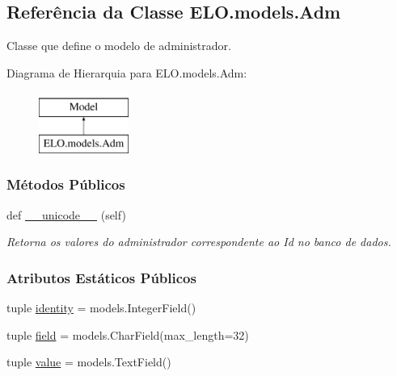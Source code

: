 \hypertarget{classELO_1_1models_1_1Adm}{}\subsection{Referência da Classe E\+L\+O.\+models.\+Adm}
\label{classELO_1_1models_1_1Adm}


Classe que define o modelo de administrador.  


Diagrama de Hierarquia para E\+L\+O.\+models.\+Adm\+:\begin{figure}[H]
\begin{center}
\leavevmode
\includegraphics[height=2.000000cm]{df/d5e/classELO_1_1models_1_1Adm}
\end{center}
\end{figure}
\subsubsection*{Métodos Públicos}
\begin{DoxyCompactItemize}
\item 
def \hyperlink{classELO_1_1models_1_1Adm_a321eaeaced2b6423fd23ad9d0401808e}{\+\_\+\+\_\+unicode\+\_\+\+\_\+} (self)
\begin{DoxyCompactList}\small\item\em Retorna os valores do administrador correspondente ao Id no banco de dados. \end{DoxyCompactList}\end{DoxyCompactItemize}
\subsubsection*{Atributos Estáticos Públicos}
\begin{DoxyCompactItemize}
\item 
tuple \hyperlink{classELO_1_1models_1_1Adm_af7e7b797ce5d3396e8a54d8927450d75}{identity} = models.\+Integer\+Field()
\item 
tuple \hyperlink{classELO_1_1models_1_1Adm_ae1af4ca22491b1cfe9cb0a7acefaa71e}{field} = models.\+Char\+Field(max\+\_\+length=32)
\item 
tuple \hyperlink{classELO_1_1models_1_1Adm_a98f249c493fbcbcd347297437a098212}{value} = models.\+Text\+Field()
\end{DoxyCompactItemize}


